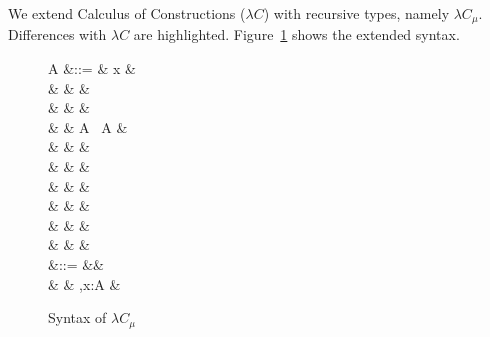 We extend Calculus of Constructions ($\lambda C$) with recursive types, namely $\lambda C_{\mu}$. Differences with $\lambda C$ are highlighted. Figure~\ref{fig:musyn} shows the extended syntax.

\begin{figure}[ht]
\small
\begin{syntax}
  A &::= & x &  \\
    & \mid & \star &  \\
    & \mid & \square &  \\
    & \mid & A \ A &  \\
    & \mid &  &  \\
    & \mid &  &  \\
    & \mid &  &  \\
    & \mid &  &  \\
    & \mid &  &  \\
    & \mid &  &  \\
  \Gamma &::= &\varnothing &  \\
         & \mid & \Gamma,x:A & 
\end{syntax}
\caption{Syntax of $\lambda C_\mu$}\label{fig:musyn}
\end{figure}
